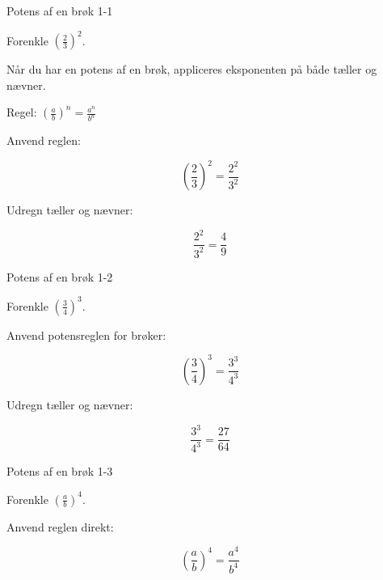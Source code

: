 \documentclass{article}
\begin{document}

\tableofcontents
\newpage

\begin{exercise}{Potens af en brøk 1-1}

Forenkle $\left(\frac{2}{3}\right)^2$.


\hint

Når du har en potens af en brøk, appliceres eksponenten på både tæller og nævner.

\hint

Regel: $\left(\frac{a}{b}\right)^n = \frac{a^n}{b^n}$

\hint

Anvend reglen:

\hint
\[
\left(\frac{2}{3}\right)^2 = \frac{2^2}{3^2}
\]

\hint

Udregn tæller og nævner:

\hint
\[
\frac{2^2}{3^2} = \frac{4}{9}
\]

\end{exercise}

\newpage

\begin{exercise}{Potens af en brøk 1-2}

Forenkle $\left(\frac{3}{4}\right)^3$.


\hint

Anvend potensreglen for brøker:

\hint
\[
\left(\frac{3}{4}\right)^3 = \frac{3^3}{4^3}
\]

\hint

Udregn tæller og nævner:

\hint
\[
\frac{3^3}{4^3} = \frac{27}{64}
\]

\end{exercise}

\newpage

\begin{exercise}{Potens af en brøk 1-3}

Forenkle $\left(\frac{a}{b}\right)^4$.


\hint

Anvend reglen direkt:

\hint
\[
\left(\frac{a}{b}\right)^4 = \frac{a^4}{b^4}
\]

\end{exercise}
\end{document}
